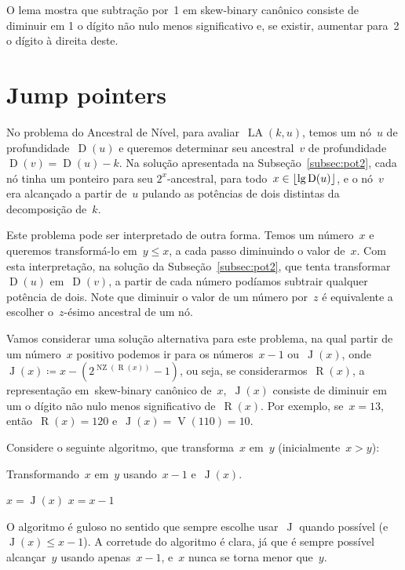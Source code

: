 \documentclass[main.tex]{subfiles}
\newcommand{\LA}{\operatorname{LA}}
\newcommand{\Dep}{\operatorname{D}}
\newcommand{\NZ}{\operatorname{NZ}}
\renewcommand{\V}{\operatorname{V}}
\newcommand{\R}{\operatorname{R}}
\newcommand{\J}{\operatorname{J}}
\begin{document}
O lema mostra que subtração por~1 em skew-binary canônico consiste de diminuir em 1 o dígito não nulo menos significativo e, se existir, aumentar para~2 o dígito à direita deste.

\section{Jump pointers}

No problema do Ancestral de Nível, para avaliar~$\LA(k, u)$, temos um nó~$u$ de profundidade~$\Dep(u)$ e queremos determinar seu ancestral~$v$ de profundidade~${\Dep(v) = \Dep(u) - k}$. Na solução apresentada na Subseção~\ref{subsec:pot2}, cada nó tinha um ponteiro para seu $2^x$-ancestral, para todo~${x \in \floor{\lg\Dep(u)}}$, e o nó~$v$ era alcançado a partir de~$u$ pulando as potências de dois distintas da decomposição de~$k$.

Este problema pode ser interpretado de outra forma. Temos um número~$x$ e queremos transformá-lo em~$y \leq x$, a cada passo diminuindo o valor de~$x$. Com esta interpretação, na solução da Subseção~\ref{subsec:pot2}, que tenta transformar~$\Dep(u)$ em~$\Dep(v)$, a partir de cada número podíamos subtrair qualquer potência de dois. Note que diminuir o valor de um número por~$z$ é equivalente a escolher o~$z$-ésimo ancestral de um nó.

Vamos considerar uma solução alternativa para este problema, na qual partir de um número~$x$ positivo podemos ir para os números~$x-1$ ou~$\J(x)$, onde~${\J(x) \coloneqq x - (2^{\NZ(\R(x))} - 1)}$, ou seja, se considerarmos~$\R(x)$, a representação em~skew-binary canônico de~$x$,~$\J(x)$ consiste de diminuir em um o dígito não nulo menos significativo de~$\R(x)$. Por exemplo, se~$x = 13$, então~${\R(x) = 120}$ e~${\J(x) = \V(110) = 10}$.

Considere o seguinte algoritmo, que transforma~$x$ em~$y$ (inicialmente~$x > y$):
\begin{algorithm}[h]
\caption{Transformando~$x$ em~$y$ usando~$x-1$ e~$\J(x)$. \label{lst:xysub}}
\begin{algorithmic}[1]
		\If{$\J(x) \geq y$}
			\State $x = \J(x)$
		\Else
			\State $x = x - 1$
		\EndIf
	\EndWhile
\end{algorithmic}
\end{algorithm}

O algoritmo é guloso no sentido que sempre escolhe usar~$\J$ quando possível (e~${\J(x) \leq x - 1}$). A corretude do algoritmo é clara, já que é sempre possível alcançar~$y$ usando apenas~$x-1$, e~$x$ nunca se torna menor que~$y$.
\end{document}
